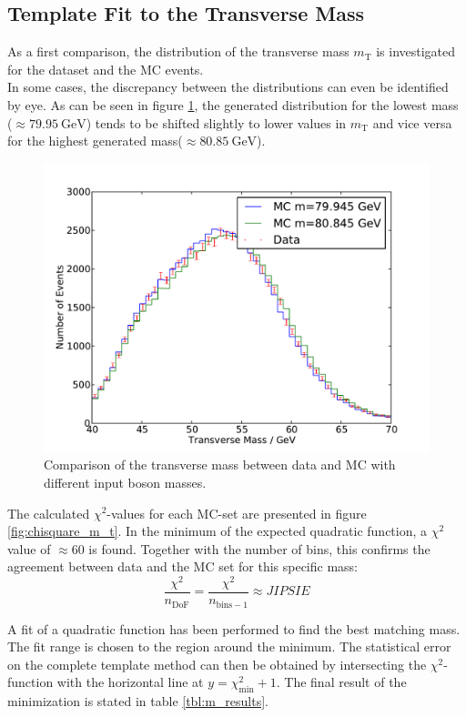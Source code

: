 \documentclass[
	paper=A4,
	parskip=full,
	chapterprefix=true,
	11pt,
	headings=normal,
	bibliography=totoc,
	listof=totoc,
	titlepage=on,
]{scrreprt}
\newcommand{\MT}{\ensuremath{{m_\mathrm{T}}}\xspace}
\begin{document}
\subsection{Template Fit to the Transverse Mass}
As a first comparison, the distribution of the transverse mass \MT is investigated for the dataset and the MC events.\\
In some cases, the discrepancy between the distributions can even be identified by eye. As can be seen in figure \ref{fig:comparison_m_t}, the generated distribution for the lowest \PW mass ($\approx\SI{79.95}{\giga\electronvolt}$) tends to be shifted slightly to lower values in \MT and vice versa for the highest generated \PW mass($\approx\SI{80.85}{\giga\electronvolt}$). 
\begin{figure}
	\centering
	\includegraphics{comparison_m_t}
	\caption{Comparison of the transverse mass between data and MC with different input \PW boson masses.}
	\label{fig:comparison_m_t}
\end{figure}

The calculated $\chi^2$-values for each MC-set are presented in figure \ref{fig:chisquare_m_t}. In the minimum of the expected quadratic function, a $\chi^2 $ value of $\approx 60$ is found. Together with the number of bins, this confirms the agreement between data and the MC set for this specific mass:
\begin{equation}
\frac{\chi^2}{n_{\mathrm{DoF}}} = \frac{\chi^2}{n_{\mathrm{bins}-1}} \approx JIPSIE 
\end{equation}

A fit of a quadratic function has been performed to find the best matching \PW mass. The fit range is chosen to the region around the minimum. The statistical error on the complete template method can then be obtained by intersecting the $\chi^2$-function with the horizontal line at $y=\chi^2_{\mathrm{min}}+1$. The final result of the minimization is stated in table \ref{tbl:m_results}.
\end{document}
